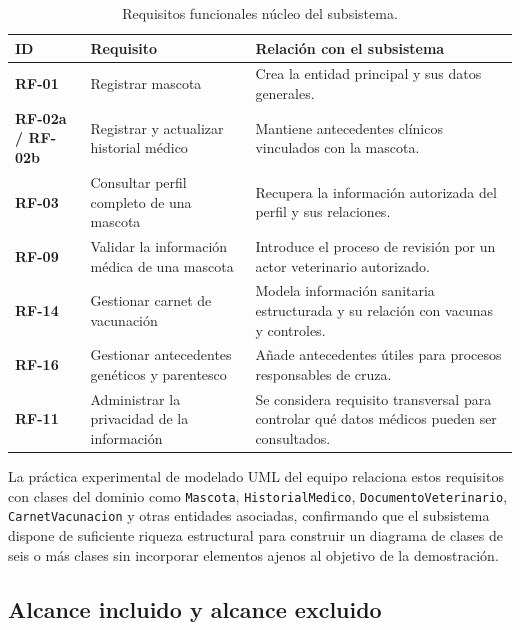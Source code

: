 \documentclass[journal,onecolumn]{IEEEtran}
\begin{document}
	\begin{table}[H]
		\caption{Requisitos funcionales núcleo del subsistema.}
		\label{tab:rf_nucleo}
		\centering
		\begin{tabularx}{\linewidth}{|C{2cm}|L{4cm}|X|}
			\hline
			\textbf{ID} & \textbf{Requisito} & \textbf{Relación con el subsistema} \\
			\hline
			\textbf{RF-01} & Registrar mascota & Crea la entidad principal y sus datos generales. \\
			\hline
			\textbf{RF-02a / RF-02b} & Registrar y actualizar historial médico & Mantiene antecedentes clínicos vinculados con la mascota. \\
			\hline
			\textbf{RF-03} & Consultar perfil completo de una mascota & Recupera la información autorizada del perfil y sus relaciones. \\
			\hline
			\textbf{RF-09} & Validar la información médica de una mascota & Introduce el proceso de revisión por un actor veterinario autorizado. \\
			\hline
			\textbf{RF-14} & Gestionar carnet de vacunación & Modela información sanitaria estructurada y su relación con vacunas y controles. \\
			\hline
			\textbf{RF-16} & Gestionar antecedentes genéticos y parentesco & Añade antecedentes útiles para procesos responsables de cruza. \\
			\hline
			\textbf{RF-11} & Administrar la privacidad de la información & Se considera requisito transversal para controlar qué datos médicos pueden ser consultados. \\
			\hline
		\end{tabularx}
	\end{table}
	
	La práctica experimental de modelado UML del equipo relaciona estos requisitos con clases del dominio como \texttt{Mascota}, \texttt{HistorialMedico}, \texttt{DocumentoVeterinario}, \texttt{CarnetVacunacion} y otras entidades asociadas, confirmando que el subsistema dispone de suficiente riqueza estructural para construir un diagrama de clases de seis o más clases sin incorporar elementos ajenos al objetivo de la demostración.
	
	\subsection{Alcance incluido y alcance excluido}
	
\end{document}
